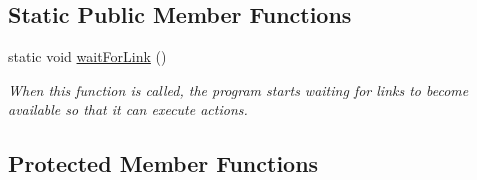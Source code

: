 \subsection*{\-Static \-Public \-Member \-Functions}
\begin{DoxyCompactItemize}
\item 
static void \hyperlink{classexekutor_1_1ActionExekutor_a1aa23235e75f6c59983115b9e3c4dbfd}{wait\-For\-Link} ()
\begin{DoxyCompactList}\small\item\em \-When this function is called, the program starts waiting for links to become available so that it can execute actions. \end{DoxyCompactList}\end{DoxyCompactItemize}
\subsection*{\-Protected \-Member \-Functions}
